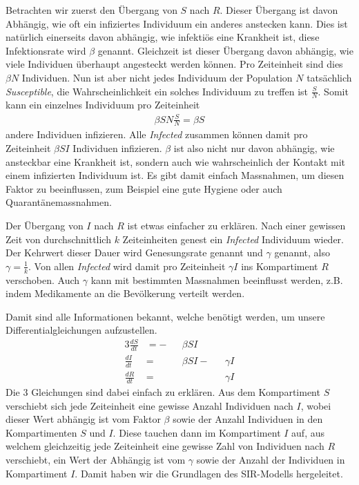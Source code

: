\begin{refsection}
Betrachten wir zuerst den Übergang von $S$ nach $R$.
Dieser Übergang ist davon Abhängig, wie oft ein infiziertes Individuum ein anderes anstecken kann.
Dies ist natürlich einerseits davon abhängig, wie infektiös eine Krankheit ist, diese Infektionsrate wird $\beta$ genannt.
Gleichzeit ist dieser Übergang davon abhängig, wie viele Individuen überhaupt angesteckt werden können. 
Pro Zeiteinheit sind dies $\beta N$ Individuen.
Nun ist aber nicht jedes Individuum der Population $N$ tatsächlich \emph{Susceptible}, die Wahrscheinlichkeit ein solches Individuum zu treffen ist $\frac{S}{N}$.
Somit kann ein einzelnes Individuum pro Zeiteinheit 
\begin{align*}
  \beta S N \frac{S}{N} = \beta S
\end{align*}
andere Individuen infizieren.
Alle \emph{Infected} zusammen können damit pro Zeiteinheit $\beta S I$ Individuen infizieren. 
$\beta$ ist also nicht nur davon abhängig, wie ansteckbar eine Krankheit ist, sondern auch wie wahrscheinlich der Kontakt mit einem infizierten Individuum ist. 
Es gibt damit einfach Massnahmen, um diesen Faktor zu beeinflussen, zum Beispiel eine gute Hygiene oder auch Quarantänemassnahmen.

Der Übergang von $I$ nach $R$ ist etwas einfacher zu erklären. 
Nach einer gewissen Zeit von durchschnittlich $k$ Zeiteinheiten genest ein \emph{Infected} Individuum wieder.
Der Kehrwert dieser Dauer wird Genesungsrate genannt und $\gamma$ genannt, also $\gamma = \frac{1}{k}$.
Von allen \emph{Infected} wird damit pro Zeiteinheit $\gamma I$ ins Kompartiment $R$ verschoben.
Auch $\gamma$ kann mit bestimmten Massnahmen beeinflusst werden, z.B. indem Medikamente an die Bevölkerung verteilt werden.

Damit sind alle Informationen bekannt, welche benötigt werden, um unsere Differentialgleichungen aufzustellen. 
\begin{alignat*}{3}
  \frac{dS}{dt} & = - && \beta S I  \\
  \frac{dI}{dt} & =   && \beta S I - && \gamma I \\
  \frac{dR}{dt} & =   &&             && \gamma I 
\end{alignat*}
Die 3 Gleichungen sind dabei einfach zu erklären. 
Aus dem Kompartiment $S$ verschiebt sich jede Zeiteinheit eine gewisse Anzahl Individuen nach $I$, wobei dieser Wert abhängig ist vom Faktor $\beta$ sowie der Anzahl Individuen in den Kompartimenten $S$ und $I$.
Diese tauchen dann im Kompartiment $I$ auf, aus welchem gleichzeitig jede Zeiteinheit eine gewisse Zahl von Individuen nach $R$ verschiebt, ein Wert der Abhängig ist vom $\gamma$ sowie der Anzahl der Individuen in Kompartiment $I$. 
Damit haben wir die Grundlagen des SIR-Modells hergeleitet. 


\end{refsection}
